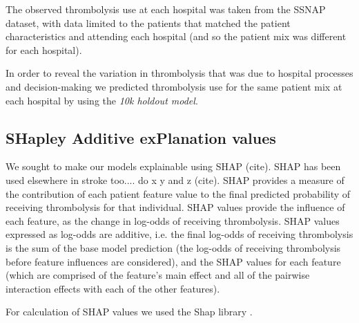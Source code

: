 The observed thrombolysis use at each hospital was taken from the SSNAP dataset, with data limited to the patients that matched the patient characteristics and attending each hospital (and so the patient mix was different for each hospital).

In order to reveal the variation in thrombolysis that was due to hospital processes and decision-making we predicted thrombolysis use for the same patient mix at each hospital by using the \emph{10k holdout model}.





\subsection{SHapley Additive exPlanation values}

We sought to make our models explainable using SHAP (cite). SHAP has been used elsewhere in stroke too.... do x y and z (cite). SHAP provides a measure of the contribution of each patient feature value to the final predicted probability of receiving thrombolysis for that individual. SHAP values provide the influence of each feature, as the change in log-odds of receiving thrombolysis. SHAP values expressed as log-odds are additive, i.e. the final log-odds of receiving thrombolysis is the sum of the base model prediction (the log-odds of receiving thrombolysis before feature influences are considered), and the SHAP values for each feature (which are comprised of the feature's main effect and all of the pairwise interaction effects with each of the other features). 

For calculation of SHAP values we used the Shap library \cite{lundberg_unified_2017}.

